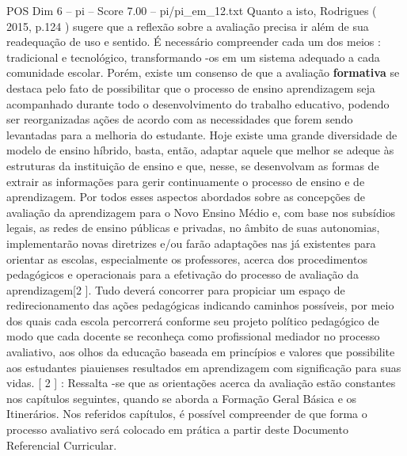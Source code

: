 \begin{textsample}{POS Dim 6 – pi – Score 7.00 – pi/pi\_em\_12.txt}
Quanto a isto, Rodrigues ( 2015, p.124 ) sugere que a reflexão sobre a avaliação precisa ir além de sua readequação de uso e sentido.
É necessário compreender cada um dos meios : tradicional e tecnológico, transformando -os em um sistema adequado a cada comunidade escolar.
Porém, existe um consenso de que a avaliação \textbf{formativa} se destaca pelo fato de possibilitar que o processo de ensino aprendizagem seja acompanhado durante todo o desenvolvimento do trabalho educativo, podendo ser reorganizadas ações de acordo com as necessidades que forem sendo levantadas para a melhoria do estudante.
Hoje existe uma grande diversidade de modelo de ensino híbrido, basta, então, adaptar aquele que melhor se adeque às estruturas da instituição de ensino e que, nesse, se desenvolvam as formas de extrair as informações para gerir continuamente o processo de ensino e de aprendizagem.
Por todos esses aspectos abordados sobre as concepções de avaliação da aprendizagem para o Novo Ensino Médio e, com base nos subsídios legais, as redes de ensino públicas e privadas, no âmbito de suas autonomias, implementarão novas diretrizes e/ou farão adaptações nas já existentes para orientar as escolas, especialmente os professores, acerca dos procedimentos pedagógicos e operacionais para a efetivação do processo de avaliação da aprendizagem[2 ].
Tudo deverá concorrer para propiciar um espaço de redirecionamento das ações pedagógicas indicando caminhos possíveis, por meio dos quais cada escola percorrerá conforme seu projeto político pedagógico de modo que cada docente se reconheça como profissional mediador no processo avaliativo, aos olhos da educação baseada em princípios e valores que possibilite aos estudantes piauienses resultados em aprendizagem com significação para suas vidas. [ 2 ] : Ressalta -se que as orientações acerca da avaliação estão constantes nos capítulos seguintes, quando se aborda a Formação Geral Básica e os Itinerários.
Nos referidos capítulos, é possível compreender de que forma o processo avaliativo será colocado em prática a partir deste Documento Referencial Curricular.

\end{textsample}
